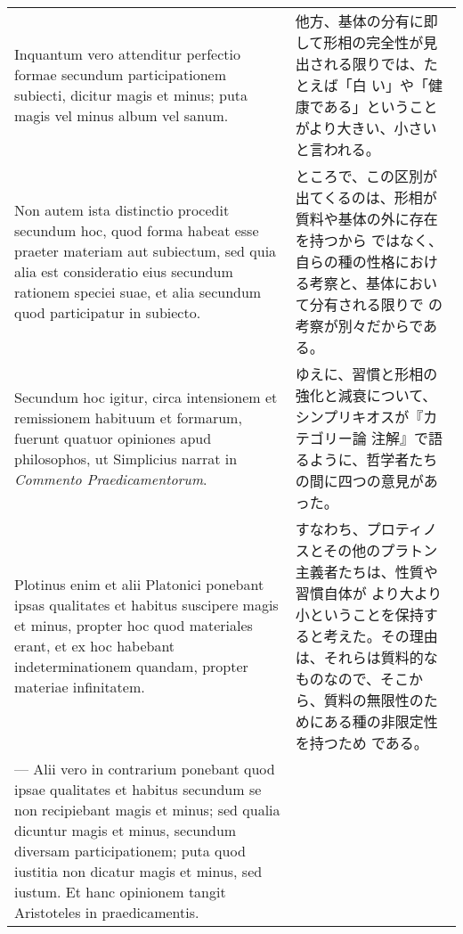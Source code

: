 \documentclass[10pt]{jsarticle} %
\begin{document}
\begin{longtable}{p{21em}p{21em}}
\\


Inquantum vero attenditur perfectio formae
secundum participationem subiecti, dicitur magis et minus; puta magis
vel minus album vel sanum. 


&

他方、基体の分有に即して形相の完全性が見出される限りでは、たとえば「白
 い」や「健康である」ということがより大きい、小さいと言われる。

\\


Non autem ista distinctio procedit secundum
hoc, quod forma habeat esse praeter materiam aut subiectum, sed quia
alia est consideratio eius secundum rationem speciei suae, et alia
secundum quod participatur in subiecto. 


&

ところで、この区別が出てくるのは、形相が質料や基体の外に存在を持つから
 ではなく、自らの種の性格における考察と、基体において分有される限りで
 の考察が別々だからである。

\\


Secundum hoc igitur, circa
intensionem et remissionem habituum et formarum, fuerunt quatuor
opiniones apud philosophos, ut Simplicius narrat in {\itshape Commento
Praedicamentorum}. 


&

ゆえに、習慣と形相の強化と減衰について、シンプリキオスが『カテゴリー論
 注解』で語るように、哲学者たちの間に四つの意見があった。

\\


Plotinus enim et alii Platonici ponebant ipsas
qualitates et habitus suscipere magis et minus, propter hoc quod
materiales erant, et ex hoc habebant indeterminationem quandam,
propter materiae infinitatem. 


&

すなわち、プロティノスとその他のプラトン主義者たちは、性質や習慣自体が
より大より小ということを保持すると考えた。その理由は、それらは質料的な
 ものなので、そこから、質料の無限性のためにある種の非限定性を持つため
 である。

\\


--- Alii vero in contrarium ponebant quod
ipsae qualitates et habitus secundum se non recipiebant magis et
minus; sed qualia dicuntur magis et minus, secundum diversam
participationem; puta quod iustitia non dicatur magis et minus, sed
iustum. Et hanc opinionem tangit Aristoteles in praedicamentis.



\end{longtable}
\end{document}
